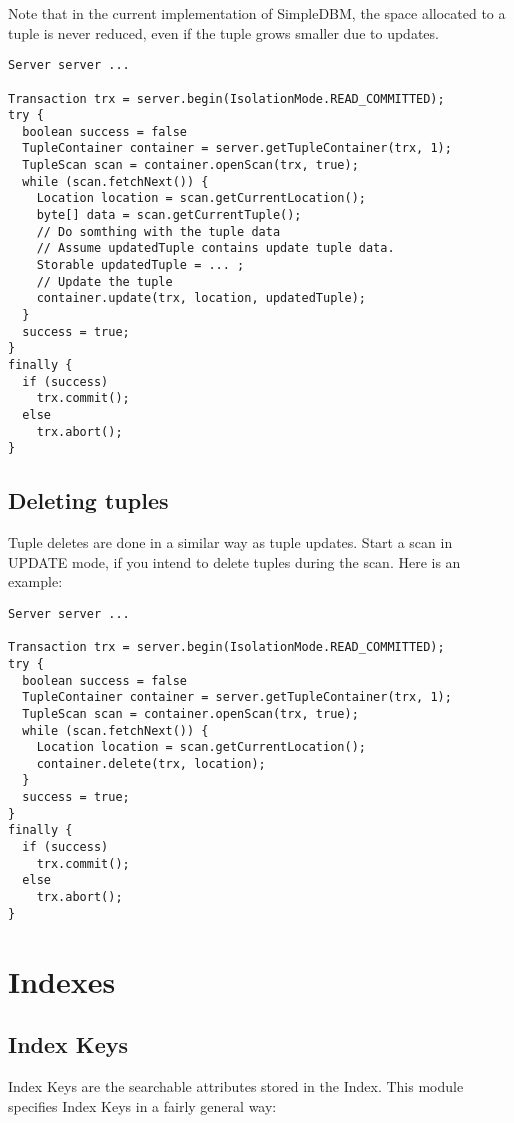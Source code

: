 \documentclass[a4paper,draft,oneside]{book}
\begin{document}
Note that in the current implementation of SimpleDBM, the space
allocated to a tuple is never reduced, even if the tuple grows smaller
due to updates.

\begin{verbatim}
Server server ...

Transaction trx = server.begin(IsolationMode.READ_COMMITTED);
try {
  boolean success = false      
  TupleContainer container = server.getTupleContainer(trx, 1);
  TupleScan scan = container.openScan(trx, true);
  while (scan.fetchNext()) {
    Location location = scan.getCurrentLocation();
    byte[] data = scan.getCurrentTuple();
    // Do somthing with the tuple data
    // Assume updatedTuple contains update tuple data.
    Storable updatedTuple = ... ;
    // Update the tuple
    container.update(trx, location, updatedTuple);
  }
  success = true;
}
finally {
  if (success)
    trx.commit();
  else
    trx.abort();
}
\end{verbatim}

\section{Deleting tuples}

Tuple deletes are done in a similar way as tuple updates.
Start a scan in UPDATE mode, if you intend to delete tuples
during the scan. Here is an example:

\begin{verbatim}
Server server ...

Transaction trx = server.begin(IsolationMode.READ_COMMITTED);
try {
  boolean success = false      
  TupleContainer container = server.getTupleContainer(trx, 1);
  TupleScan scan = container.openScan(trx, true);
  while (scan.fetchNext()) {
    Location location = scan.getCurrentLocation();
    container.delete(trx, location);
  }
  success = true;
}
finally {
  if (success)
    trx.commit();
  else
    trx.abort();
}
\end{verbatim}

\chapter{Indexes}
\label{sec:indexes}

\section{Index Keys}

Index Keys are the searchable attributes stored in the Index. This module
specifies Index Keys in a fairly general way:
\end{document}
